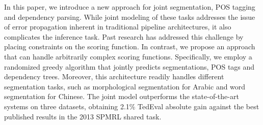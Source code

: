 In this paper, we introduce a new approach for joint segmentation, POS tagging and dependency parsing. While joint modeling of these tasks addresses the issue of error propagation inherent in traditional pipeline architectures, it also complicates the inference task. Past research has addressed this challenge by placing constraints on the scoring function. In contrast, we propose an approach that can handle arbitrarily complex scoring functions. Specifically, we employ a randomized greedy algorithm that jointly predicts segmentations, POS tags and dependency trees. Moreover, this architecture readily handles different segmentation tasks, such as morphological segmentation for Arabic and word segmentation for Chinese. The joint model outperforms the state-of-the-art systems on three datasets, obtaining 2.1\% TedEval absolute gain against the best published results in the 2013 SPMRL shared task.

